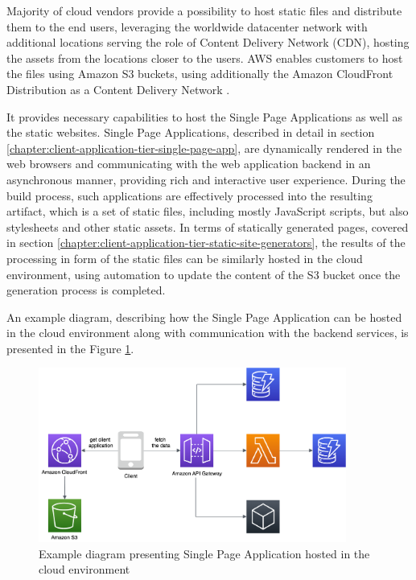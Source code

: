 Majority of cloud vendors provide a possibility to host static files and distribute them to the end users, leveraging the worldwide datacenter network with additional locations serving the role of Content Delivery Network (CDN), hosting the assets from the locations closer to the users.
AWS enables customers to host the files using Amazon S3 buckets, using additionally the Amazon CloudFront Distribution as a Content Delivery Network  \cite{AWSWebHosting}.

It provides necessary capabilities to host the Single Page Applications as well as the static websites.
Single Page Applications, described in detail in section \ref{chapter:client-application-tier-single-page-app}, are dynamically rendered in the web browsers and communicating with the web application backend in an asynchronous manner, providing rich and interactive user experience.
During the build process, such applications are effectively processed into the resulting artifact, which is a set of static files, including mostly JavaScript scripts, but also stylesheets and other static assets.
In terms of statically generated pages, covered in section \ref{chapter:client-application-tier-static-site-generators}, the results of the processing in form of the static files can be similarly hosted in the cloud environment, using automation to update the content of the S3 bucket once the generation process is completed.

An example diagram, describing how the Single Page Application can be hosted in the cloud environment along with communication with the backend services, is presented in the Figure \ref{fig:pattern-client-hosted}.

\begin{figure}[H]
   \centering
   \includegraphics[width=0.9\textwidth]{assets/04-serverless-for-web-apps/hostedClient.png}
   \caption{Example diagram presenting Single Page Application hosted in the cloud environment}
   \label{fig:pattern-client-hosted}
\end{figure}

